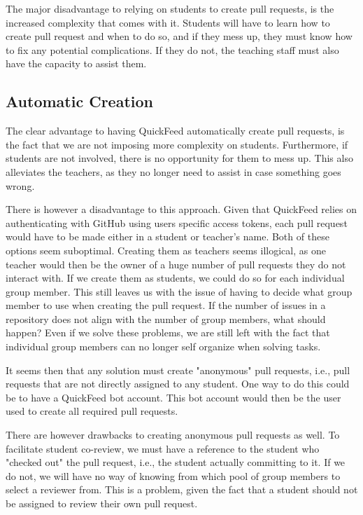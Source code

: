 The major disadvantage to relying on students to create pull requests, is the increased complexity that comes with it.
Students will have to learn how to create pull request and when to do so, and if they mess up, they must know how to fix any potential complications.
If they do not, the teaching staff must also have the capacity to assist them.

\subsection{Automatic Creation}

The clear advantage to having QuickFeed automatically create pull requests, is the fact that we are not imposing more complexity on students.
Furthermore, if students are not involved, there is no opportunity for them to mess up.
This also alleviates the teachers, as they no longer need to assist in case something goes wrong.

There is however a disadvantage to this approach.
Given that QuickFeed relies on authenticating with GitHub using users specific access tokens, each pull request would have to be made either in a student or teacher's name.
Both of these options seem suboptimal.
Creating them as teachers seems illogical, as one teacher would then be the owner of a huge number of pull requests they do not interact with.
If we create them as students, we could do so for each individual group member.
This still leaves us with the issue of having to decide what group member to use when creating the pull request.
If the number of issues in a repository does not align with the number of group members, what should happen?
Even if we solve these problems, we are still left with the fact that individual group members can no longer self organize when solving tasks.

It seems then that any solution must create "anonymous" pull requests, i.e., pull requests that are not directly assigned to any student.
One way to do this could be to have a QuickFeed bot account.
This bot account would then be the user used to create all required pull requests.

There are however drawbacks to creating anonymous pull requests as well.
To facilitate student co-review, we must have a reference to the student who "checked out" the pull request, i.e., the student actually committing to it.
If we do not, we will have no way of knowing from which pool of group members to select a reviewer from.
This is a problem, given the fact that a student should not be assigned to review their own pull request.

